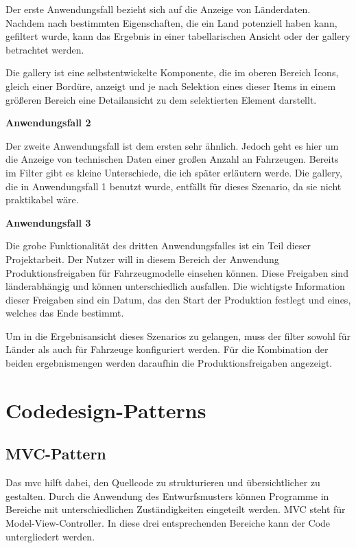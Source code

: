 Der erste Anwendungsfall bezieht sich auf die Anzeige von Länderdaten. Nachdem nach bestimmten Eigenschaften, die ein Land potenziell haben kann, gefiltert wurde, kann das Ergebnis in einer tabellarischen Ansicht oder der \gls{gallery} betrachtet werden.

Die \gls{gallery} ist eine selbstentwickelte Komponente, die im oberen Bereich Icons, gleich einer Bordüre, anzeigt und je nach Selektion eines dieser Items in einem größeren Bereich eine Detailansicht zu dem selektierten Element darstellt.

\textbf{Anwendungsfall 2}

Der zweite Anwendungsfall ist dem ersten sehr ähnlich. Jedoch geht es hier um die Anzeige von technischen Daten einer großen Anzahl an Fahrzeugen. Bereits im Filter gibt es kleine Unterschiede, die ich später erläutern werde. Die \gls{gallery}, die in Anwendungsfall 1 benutzt wurde, entfällt für dieses Szenario, da sie nicht praktikabel wäre.

\textbf{Anwendungsfall 3}

Die grobe Funktionalität des dritten Anwendungsfalles ist ein Teil dieser Projektarbeit. Der Nutzer will in diesem Bereich der Anwendung Produktionsfreigaben für Fahrzeugmodelle einsehen können. Diese Freigaben sind länderabhängig und können unterschiedlich ausfallen. Die wichtigste Information dieser Freigaben sind ein Datum, das den Start der Produktion festlegt und eines, welches das Ende bestimmt.

Um in die Ergebnisansicht dieses Szenarios zu gelangen, muss der \gls{filter} sowohl für Länder als auch für Fahrzeuge konfiguriert werden. Für die Kombination der beiden \gls{ergebnismenge}n werden daraufhin die Produktionsfreigaben angezeigt.
\section{Codedesign-Patterns} \label{sec:grundPattern}
\subsection{MVC-Pattern} \label{sec:patternMVC}
Das \gls{mvc} hilft dabei, den Quellcode zu strukturieren und übersichtlicher zu gestalten. Durch die Anwendung des Entwurfsmusters können Programme in Bereiche mit unterschiedlichen Zuständigkeiten eingeteilt werden. MVC steht für Model-View-Controller. In diese drei entsprechenden Bereiche kann der Code untergliedert werden. \cite[S. 529ff.]{Freeman2006}

